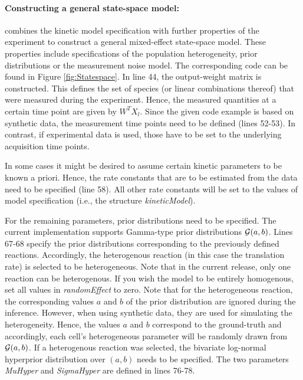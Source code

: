 \documentclass[a4paper, 9pt]{scrartcl}
\begin{document}
\paragraph{Constructing a general state-space model:}

\DPP combines the kinetic model specification with further properties of the experiment to construct a general mixed-effect state-space model. These properties include specifications of the population heterogeneity, prior distributions or the measurement noise model. The corresponding code can be found in Figure \ref{fig:Statespace}. In line 44, the output-weight matrix is constructed. This defines the set of species (or linear combinations thereof) that were measured during the experiment. Hence, the measured quantities at a certain time point are given by $W^{T} X_{l}$. 
Since the given code example is based on synthetic data, the measurement time points need to be defined (lines 52-53). In contrast, if experimental data is used, those have to be set to the underlying acquisition time points. \newline

In some cases it might be desired to assume certain kinetic parameters to be known a priori. Hence, the rate constants that are to be estimated from the data need to be specified (line 58). All other rate constants will be set to the values of model specification (i.e., the structure \textit{kineticModel}).

For the remaining parameters, prior distributions need to be specified. The current implementation supports Gamma-type prior distributions $\mathcal{G}(a, b)$. Lines 67-68 specify the prior distributions corresponding to the previously defined reactions. Accordingly, the heterogenous reaction (in this case the translation rate) is selected to be heterogeneous. Note that in the current release, only one reaction can be heterogenous. If you wish the model to be entirely homogenous, set all values in \textit{randomEffect} to zero. Note that for the heterogeneous reaction, the corresponding values $a$ and $b$ of the prior distribution are ignored during the inference. However, when using synthetic data, they are used for simulating the heterogeneity. Hence, the values $a$ and $b$ correspond to the ground-truth and accordingly, each cell's heterogeneous parameter will be randomly drawn from $\mathcal{G}(a, b)$. If a heterogenous reaction was selected, the bivariate log-normal hyperprior distribution over $(a, b)$ needs to be specified. The two parameters \textit{MuHyper} and \textit{SigmaHyper} are defined in lines 76-78. \newline
\end{document}

